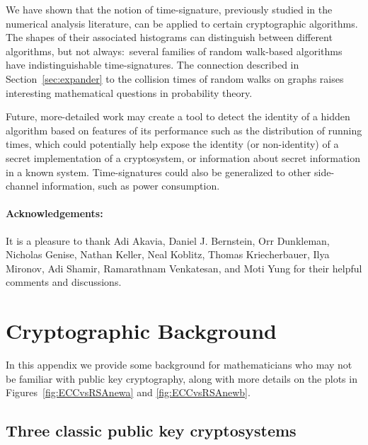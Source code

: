 \documentclass{llncs}
\newcommand{\secref}[1]{Section~\ref{#1}}
\numberwithin{equation}{section}
\renewcommand\({\left(}
\renewcommand\){\right)}
\begin{document}
We have shown that the notion of time-signature, previously studied in the numerical analysis literature, can be applied to certain cryptographic algorithms.  The shapes of their associated histograms can distinguish between different algorithms, but not always:~several families of random walk-based algorithms have indistinguishable time-signatures.  The connection described in \secref{sec:expander} to the  collision times of random walks on graphs raises interesting mathematical questions  in probability theory.

Future, more-detailed work may create a tool to detect the identity of a hidden algorithm based on  features of its performance such as the distribution of  running times, which could potentially help expose the identity (or non-identity) of a secret implementation of a cryptosystem, or   information about  secret information in a known system.  Time-signatures could also be generalized to other side-channel information, such as power consumption.


\paragraph{\bf Acknowledgements:} It is a pleasure to thank Adi Akavia, Daniel J. Bernstein,  Orr Dunkleman, Nicholas Genise,  Nathan Keller, Neal Koblitz, Thomas Kriecherbauer, Ilya Mironov, Adi Shamir, Ramarathnam Venka\-tesan, and Moti Yung for their helpful comments and discussions.


\appendix


\section{Cryptographic Background}\label{sec:crypto}


In this appendix we provide some  background for mathematicians who may not be familiar with public key cryptography,
 along with more details on the plots in Figures~\ref{fig:ECCvsRSAnewa} and \ref{fig:ECCvsRSAnewb}.

\subsection{Three classic  public key cryptosystems}\label{sec:sub:DHRSA}
\end{document}

